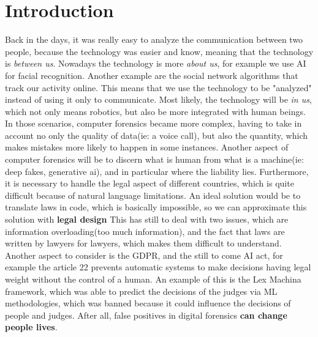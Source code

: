 \chapter{Introduction}
Back in the days, it was really easy to analyze the communication between two people, because the
technology was easier and know, meaning that the technology is \textit{between us}. Nowadays the
technology is more \textit{about us}, for example we use AI for facial recognition. Another example
are the social network algorithms that track our activity online. This means that we use the
technology to be "analyzed" instead of using it only to communicate. Most likely, the technology
will be \textit{in us}, which not only means robotics, but also be more integrated with human
beings.\\
In those scenarios, computer forensics became more complex, having to take in account no only the
quality of data(ie: a voice call), but also the quantity, which makes mistakes more likely to happen
in some instances. Another aspect of computer forensics will be to discern what is human from what
is a machine(ie: deep fakes, generative ai), and in particular where the liability lies.
Furthermore, it is necessary to handle the legal aspect of different countries, which is quite
difficult because of natural language limitations. An ideal solution would be to translate laws in
code, which is basically impossible, so we can approximate this solution with \textbf{legal design}
This has still to deal with two issues, which are information overloading(too much information), and
the fact that laws are written by lawyers for lawyers, which makes them difficult to understand.\\
Another aspect to consider is the GDPR, and the still to come AI act, for example the article 22
prevents automatic systems to make decisions having legal weight without the control of a human. An
example of this is the Lex Machina framework, which was able to predict the decisions of the judges
via ML methodologies, which was banned because it could influence the decisions of people and
judges. After all, false positives in digital forensics \textbf{can change people lives}.
